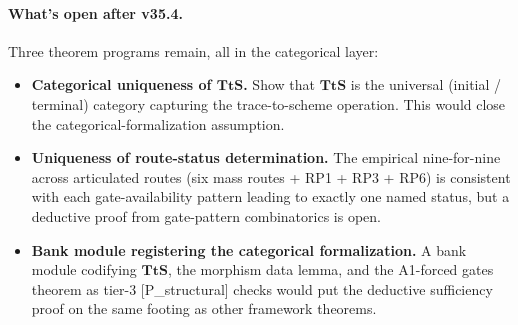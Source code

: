 \paragraph{What's open after v35.4.} Three theorem programs remain, all in the categorical layer:

\begin{itemize}
\item \textbf{Categorical uniqueness of $\mathbf{TtS}$.} Show that $\mathbf{TtS}$ is the universal (initial / terminal) category capturing the trace-to-scheme operation. This would close the categorical-formalization assumption.
\item \textbf{Uniqueness of route-status determination.} The empirical nine-for-nine across articulated routes (six mass routes + RP1 + RP3 + RP6) is consistent with each gate-availability pattern leading to exactly one named status, but a deductive proof from gate-pattern combinatorics is open.
\item \textbf{Bank module registering the categorical formalization.} A bank module codifying $\mathbf{TtS}$, the morphism data lemma, and the A1-forced gates theorem as tier-3 [P\_structural] checks would put the deductive sufficiency proof on the same footing as other framework theorems.
\end{itemize}
